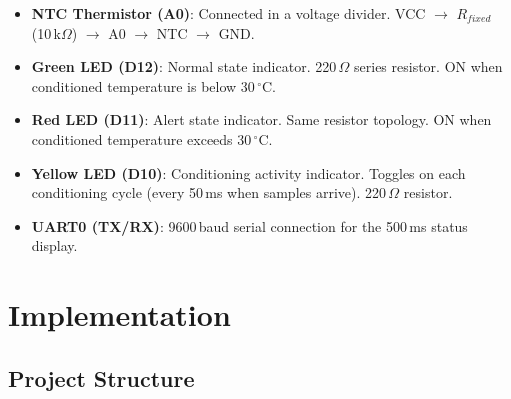 \documentclass[12pt]{article}
\begin{document}
\begin{itemize}
  \item \textbf{NTC Thermistor (A0)}: Connected in a voltage divider. VCC $\to$ $R_{fixed}$ (10\,k$\Omega$) $\to$ A0 $\to$ NTC $\to$ GND.
  \item \textbf{Green LED (D12)}: Normal state indicator. 220\,$\Omega$ series resistor. ON when conditioned temperature is below 30\,$^{\circ}$C.
  \item \textbf{Red LED (D11)}: Alert state indicator. Same resistor topology. ON when conditioned temperature exceeds 30\,$^{\circ}$C.
  \item \textbf{Yellow LED (D10)}: Conditioning activity indicator. Toggles on each conditioning cycle (every 50\,ms when samples arrive). 220\,$\Omega$ resistor.
  \item \textbf{UART0 (TX/RX)}: 9600\,baud serial connection for the 500\,ms status display.
\end{itemize}

\section{Implementation}

\subsection{Project Structure}
\end{document}
